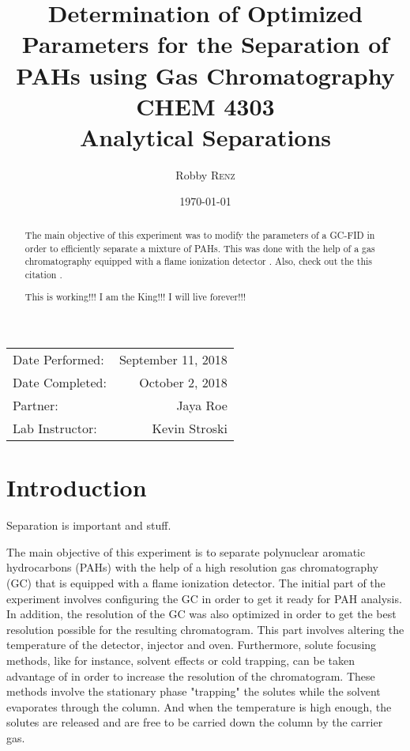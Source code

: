 \documentclass[a4paper, 12pt]{article}
\title{Determination of Optimized Parameters for the Separation of PAHs using Gas Chromatography \\ CHEM 4303 \\ Analytical Separations} %
\author{Robby \textsc{Renz}} %
\date{\today} %
\begin{document}
\maketitle %

\begin{center}
\begin{tabular}{l r}
Date Performed: & September 11, 2018 \\ %
Date Completed: & October 2, 2018 \\
Partner: & Jaya Roe \\ %
Lab Instructor: & Kevin Stroski %
\end{tabular}
\end{center}


\begin{abstract}
The main objective of this experiment was to modify the parameters of a GC-FID in order to efficiently separate a mixture of PAHs. This was done with the help of a gas chromatography equipped with a flame ionization detector \cite{Smith:2012qr}. Also, check out the this citation \cite{pah-in-soil}.

This is working!!! I am the King!!! I will live forever!!!
\end{abstract}

\newpage


\section{Introduction}
Separation is important and stuff.

The main objective of this experiment is to separate polynuclear aromatic hydrocarbons (PAHs) with the help of a high resolution gas chromatography (GC) that is equipped with a flame ionization detector. The initial part of the experiment involves configuring the GC in order to get it ready for PAH analysis. In addition, the resolution of the GC was also optimized in order to get the best resolution possible for the resulting chromatogram. This part involves altering the temperature of the detector, injector and oven. Furthermore, solute focusing methods, like for instance, solvent effects or cold trapping, can be taken advantage of in order to increase the resolution of the chromatogram. These methods involve the stationary phase "trapping" the solutes while the solvent evaporates through the column. And when the temperature is high enough, the solutes are released and are free to be carried down the column by the carrier gas.
\end{document}
